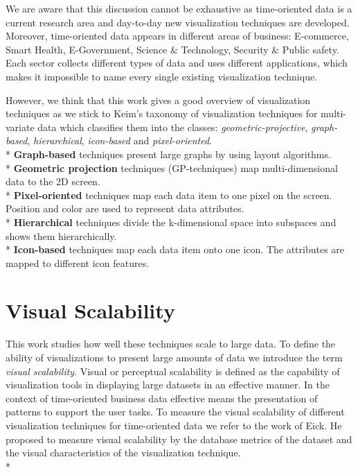 We are aware that this discussion cannot be exhaustive as time-oriented data is a current research area and day-to-day new visualization techniques are developed.
Moreover, time-oriented data appears in different areas of business: E-commerce, Smart Health, E-Government, Science \& Technology, Security \& Public safety. Each sector collects different types of data and uses different applications, which makes it impossible to name every single existing visualization technique.


However, we think that this work gives a good overview of visualization techniques as we stick to Keim's taxonomy\cite{Keim1995} of visualization techniques for multi-variate data which classifies them into the classes: \textit{geometric-projective}, \textit{graph-based}, \textit{hierarchical}, \textit{icon-based} and \textit{pixel-oriented}.
\\*
\textbf{Graph-based} techniques present large graphs by using layout algorithms\cite{Keim1996}.
\\*
\textbf{Geometric projection} techniques (GP-techniques) map multi-dimensional data to the 2D screen\cite{FerreiradeOliveira2003}.
\\*
\textbf{Pixel-oriented} techniques map each data item to one pixel on the screen. Position and color are used to represent data attributes\cite{Keim1996}.
\\*
\textbf{Hierarchical} techniques divide the k-dimensional space into subspaces and shows them hierarchically. 
\\*
\textbf{Icon-based} techniques map each data item onto one icon. The attributes are mapped to different icon features\cite{Keim2001}.

\section{Visual Scalability}

This work studies how well these techniques scale to large data. To define the ability of visualizations to present large amounts of data we introduce the term \textit{visual scalability}.
Visual or perceptual scalability is defined as the capability of visualization tools in displaying large datasets in an effective manner\cite{Eick2002}. In the context of time-oriented business data effective means the presentation of patterns to support the user tasks. To measure the visual scalability of different visualization techniques for time-oriented data we refer to the work of Eick\cite{Eick2002}. He proposed to measure visual scalability by the database metrics of the dataset and the visual characteristics of the visualization technique. \\*

